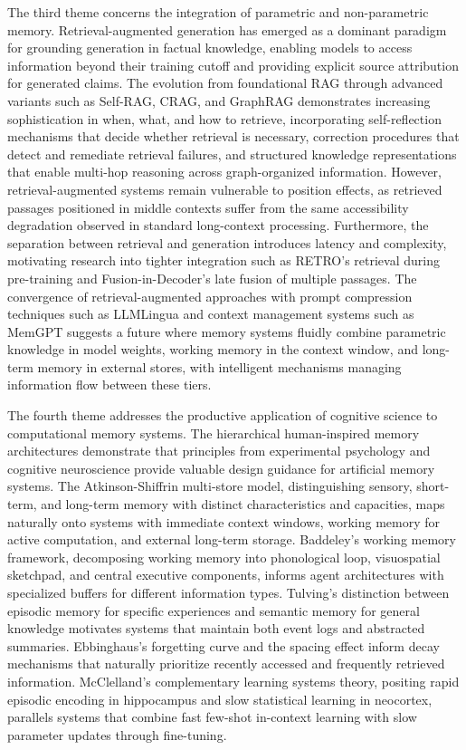 \documentclass[11pt,letterpaper]{article}
\begin{document}
The third theme concerns the integration of parametric and non-parametric memory. Retrieval-augmented generation has emerged as a dominant paradigm for grounding generation in factual knowledge, enabling models to access information beyond their training cutoff and providing explicit source attribution for generated claims. The evolution from foundational RAG through advanced variants such as Self-RAG, CRAG, and GraphRAG demonstrates increasing sophistication in when, what, and how to retrieve, incorporating self-reflection mechanisms that decide whether retrieval is necessary, correction procedures that detect and remediate retrieval failures, and structured knowledge representations that enable multi-hop reasoning across graph-organized information. However, retrieval-augmented systems remain vulnerable to position effects, as retrieved passages positioned in middle contexts suffer from the same accessibility degradation observed in standard long-context processing. Furthermore, the separation between retrieval and generation introduces latency and complexity, motivating research into tighter integration such as RETRO's retrieval during pre-training and Fusion-in-Decoder's late fusion of multiple passages. The convergence of retrieval-augmented approaches with prompt compression techniques such as LLMLingua and context management systems such as MemGPT suggests a future where memory systems fluidly combine parametric knowledge in model weights, working memory in the context window, and long-term memory in external stores, with intelligent mechanisms managing information flow between these tiers.

The fourth theme addresses the productive application of cognitive science to computational memory systems. The hierarchical human-inspired memory architectures demonstrate that principles from experimental psychology and cognitive neuroscience provide valuable design guidance for artificial memory systems. The Atkinson-Shiffrin multi-store model, distinguishing sensory, short-term, and long-term memory with distinct characteristics and capacities, maps naturally onto systems with immediate context windows, working memory for active computation, and external long-term storage. Baddeley's working memory framework, decomposing working memory into phonological loop, visuospatial sketchpad, and central executive components, informs agent architectures with specialized buffers for different information types. Tulving's distinction between episodic memory for specific experiences and semantic memory for general knowledge motivates systems that maintain both event logs and abstracted summaries. Ebbinghaus's forgetting curve and the spacing effect inform decay mechanisms that naturally prioritize recently accessed and frequently retrieved information. McClelland's complementary learning systems theory, positing rapid episodic encoding in hippocampus and slow statistical learning in neocortex, parallels systems that combine fast few-shot in-context learning with slow parameter updates through fine-tuning.
\end{document}
